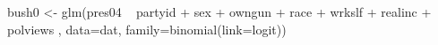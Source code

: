 \begin{Schunk}
\begin{Sinput}
 bush0 <- glm(pres04 ~ partyid + sex + owngun + race + wrkslf + realinc + polviews , data=dat, family=binomial(link=logit))
\end{Sinput}
\end{Schunk}
